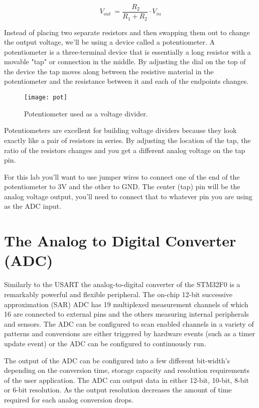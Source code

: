 \documentclass[11pt,fleqn]{book} %
\begin{document}
\begin{equation*}
    V_{out}\:=\frac{\:R_2}{R_1+R_2}\cdot V_{in}
\end{equation*}

Instead of placing two separate resistors and then swapping them out to change the output voltage, we'll be using a device called a potentiometer. A potentiometer is a three-terminal device that is essentially a long resistor with a movable "tap" or connection in the middle. By adjusting the dial on the top of the device the tap moves along between the resistive material in the potentiometer and the resistance between it and each of the endpoints changes. 

\begin{figure}[]
    \centering\texttt{[image: pot]}
    \caption{Potentiometer used as a voltage divider.}
    \label{pot}
\end{figure}

Potentiometers are excellent for building voltage dividers because they look exactly like a pair of resistors in series. By adjusting the location of the tap, the ratio of the resistors changes and you get a different analog voltage on the tap pin.

For this lab you'll want to use jumper wires to connect one of the end of the potentiometer to 3V and the other to GND. The center (tap) pin will be the analog voltage output, you'll need to connect that to whatever pin you are using as the ADC input.  
 
\section{The Analog to Digital Converter (ADC)}
Similarly to the USART the analog-to-digital converter of the STM32F0 is a remarkably powerful and flexible peripheral. The on-chip 12-bit successive approximation (SAR) ADC has 19 multiplexed measurement channels of which 16 are connected to external pins and the others measuring internal peripherals and sensors. The ADC can be configured to scan enabled channels in a variety of patterns and conversions are either triggered by hardware events (such as a timer update event) or the ADC can be configured to continuously run.

The output of the ADC can be configured into a few different bit-width's depending on the conversion time, storage capacity and resolution requirements of the user application. The ADC can output data in either 12-bit, 10-bit, 8-bit or 6-bit resolution. As the output resolution decreases the amount of time required for each analog conversion drops.
\end{document}
